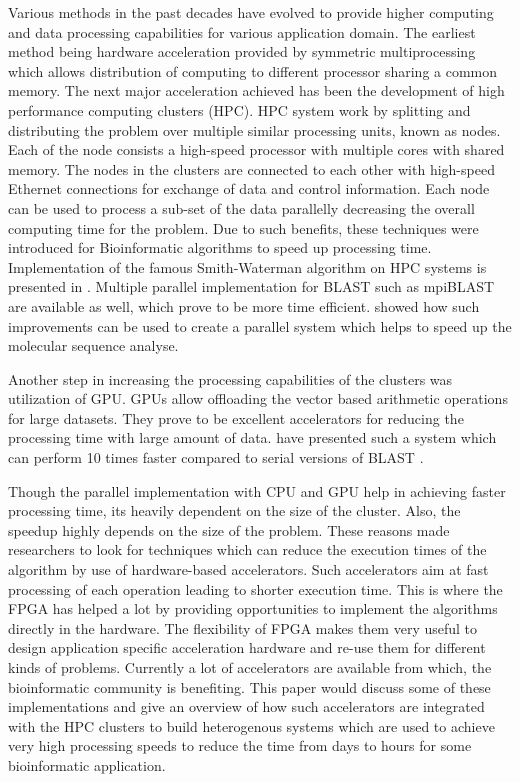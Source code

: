\documentclass[12pt,twoside]{article}
\begin{document}
Various methods in the past decades have evolved to provide higher computing and data processing capabilities for various application domain.
The earliest method being hardware acceleration provided by symmetric multiprocessing which allows distribution of computing to different processor
sharing a common memory. The next major acceleration achieved has been the development of high performance computing clusters (HPC).  HPC
system work by splitting and distributing the problem over multiple similar processing units, known as nodes. Each of the node
consists a high-speed processor with multiple cores with shared memory. The nodes in the clusters are connected to
each other with high-speed Ethernet connections for exchange of data and control information. Each node can be used to
process a sub-set of the data parallelly decreasing the overall computing time for the problem. Due to such benefits, these techniques were
introduced for Bioinformatic algorithms to speed up processing time.
Implementation of the famous Smith-Waterman algorithm on HPC systems is presented in \cite{boukerche_parallel_2005,martins_multithreaded_2000}.
Multiple parallel implementation for BLAST such as mpiBLAST \cite{darling_design_2003} are available as well, which prove
to be more time efficient. \textcite{schmidt_massively_2002} showed how such improvements can be used to create a parallel system which
helps to speed up the molecular sequence analyse.

Another step in increasing the processing capabilities of the clusters was utilization of GPU. GPUs allow offloading
the vector based arithmetic operations for large datasets. They prove to be excellent accelerators for reducing
the processing time with large amount of data. \textcite{liu_cuda-blastp:_2011} have presented such a system which can perform
10 times faster compared to serial versions of BLAST \cite{altschul_basic_1990}.

Though the parallel implementation with CPU and GPU help in achieving faster processing time, its heavily dependent
on the size of the cluster. Also, the speedup highly depends on the size of the problem. These reasons
made researchers to look for techniques which can reduce the execution times of the algorithm by use of hardware-based
accelerators. Such accelerators aim at fast processing of each operation leading to shorter execution time. This is where the FPGA has 
helped a lot by providing opportunities to implement the algorithms directly in the hardware. The flexibility
of FPGA makes them very useful to design application specific acceleration hardware and
re-use them for different kinds of problems. Currently a lot of accelerators are available from which, the bioinformatic
community is benefiting. This paper would discuss some of these implementations and give an overview of how
such accelerators are integrated with the HPC clusters to build heterogenous systems which are used to
achieve very high processing speeds to reduce the time from days to hours for some bioinformatic application.
\end{document}
